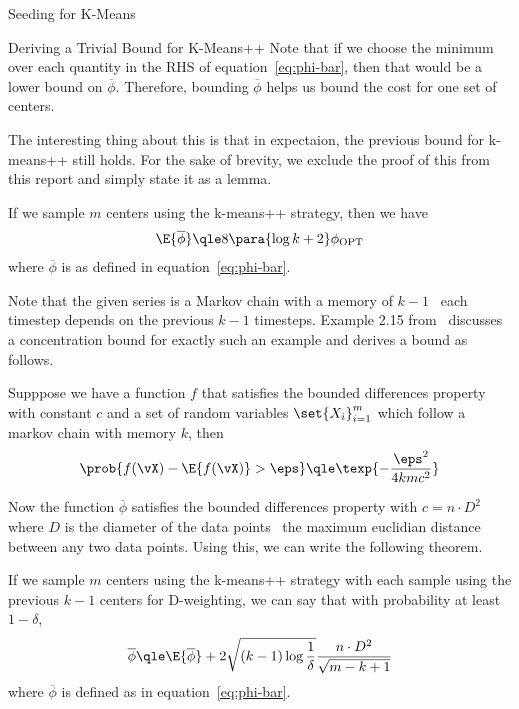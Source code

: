 \documentclass[10pt]{article}
\newcommand{\opt}[1]{#1_{\text{OPT}}}
\begin{document}
\begin{psection}{Seeding for K-Means}
\begin{psubsection}{Deriving a Trivial Bound for K-Means++}
        Note that if we choose the minimum over each quantity in the RHS of
        equation~\ref{eq:phi-bar}, then that would be a lower bound on
        $\overline{\phi}$. Therefore, bounding $\overline{\phi}$ helps us bound the
        cost for one set of centers.

        The interesting thing about this is that in expectaion, the previous bound
        for k-means++ still holds. For the sake of brevity, we exclude the proof of
        this from this report and simply state it as a lemma.
        \begin{lemma}
            If we sample $m$ centers using the k-means++ strategy, then we have
            \begin{align*}
                \E{\overline{\phi}} \qle 8 \para{\log k + 2} \opt{\phi}
            \end{align*}
            where $\overline{\phi}$ is as defined in equation~\ref{eq:phi-bar}.
        \end{lemma}

        Note that the given series is a Markov chain with a memory of $k-1$ \ie\
        each timestep depends on the previous $k-1$ timesteps. Example 2.15
        from~\cite{paulin} discusses a concentration bound for exactly such an
        example and derives a bound as follows.

        Supppose we have a function $f$ that satisfies the bounded differences
        property with constant $c$ and a set of random variables $\set{X_i}_{i=1}^m$
        which follow a markov chain with memory $k$, then
        \begin{align*}
            \prob{f(\vX) - \E{f(\vX)} > \eps} \qle \texp{-\frac{\eps^2}{4kmc^2}}
        \end{align*}

        Now the function $\overline{\phi}$ satisfies the bounded differences
        property with $c = n \cdot D^2$ where $D$ is the diameter of the data points
        \ie\ the maximum euclidian distance between any two data points. Using this,
        we can write the following theorem.

        \begin{theorem}%
            \label{thm:approx}
            If we sample $m$ centers using the k-means++ strategy with each sample
            using the previous $k-1$ centers for D\sups{2}-weighting, we can say
            that with probability at least $1 - \delta$,
            \begin{align*}
                \overline{\phi} \qle \E{\overline{\phi}} + 2 \sqrt{(k - 1) \log{\frac{1}{\delta}}} \frac{n \cdot D^2}{\sqrt{m - k + 1}}
            \end{align*}
            where $\overline{\phi}$ is defined as in equation~\ref{eq:phi-bar}.
        \end{theorem}


\end{psubsection}
\end{psection}
\end{document}
